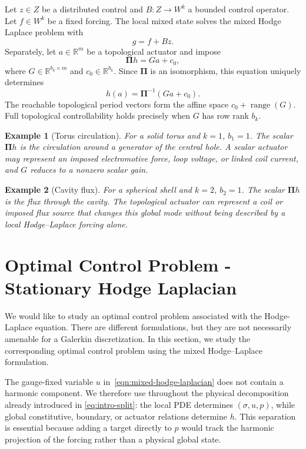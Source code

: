 \documentclass{article}
\newtheorem{example}{Example}[section]
\newcommand{\R} {\mathbb R}
\DeclareMathOperator{\range}{range}
\newcommand{\Piop}{\boldsymbol\Pi}
\begin{document}
Let $z\in Z$ be a distributed control and $B:Z\to W^k$ a bounded control operator. Let $f\in W^k$ be a fixed forcing. The local mixed state solves the mixed Hodge Laplace problem with
\begin{equation}
 g=f+Bz.
\end{equation}
Separately, let $a\in\R^m$ be a topological actuator and impose
\begin{equation}
 \Piop h=Ga+c_0,
\end{equation}
where $G\in\R^{b_k\times m}$ and $c_0\in\R^{b_k}$. Since $\Piop$ is an isomorphism, this equation uniquely determines
\begin{equation}
 h(a)=\Piop^{-1}(Ga+c_0).
\end{equation}
The reachable topological period vectors form the affine space $c_0+\range(G)$. Full topological controllability holds precisely when $G$ has row rank $b_k$.

\begin{example}[Torus circulation]
For a solid torus and $k=1$, $b_1=1$. The scalar $\Piop h$ is the circulation around a generator of the central hole. A scalar actuator may represent an imposed electromotive force, loop voltage, or linked coil current, and $G$ reduces to a nonzero scalar gain.
\end{example}

\begin{example}[Cavity flux]
For a spherical shell and $k=2$, $b_2=1$. The scalar $\Piop h$ is the flux through the cavity. The topological actuator can represent a coil or imposed flux source that changes this global mode without being described by a local Hodge--Laplace forcing alone.
\end{example}

\section{Optimal Control Problem - Stationary Hodge Laplacian}

We would like to study an optimal control problem associated with the Hodge-Laplace equation.
There are different formulations, but they are not necessarily amenable for a Galerkin discretization.
In this section, we study the corresponding optimal control problem using the mixed Hodge--Laplace formulation.


The gauge-fixed variable $u$ in~\eqref{eqn:mixed-hodge-laplacian} does not contain a harmonic component.  We therefore use throughout the physical decomposition already introduced in \eqref{eq:intro-split}: the local PDE determines $(\sigma,u,p)$, while global constitutive, boundary, or actuator relations determine $h$.  This separation is essential because adding a target directly to $p$ would track the harmonic projection of the forcing rather than a physical global state.
\end{document}
